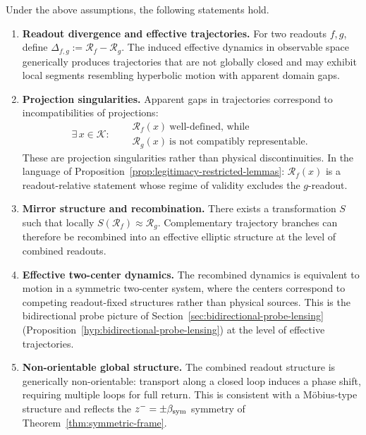 \begin{theorem}
\label{thm:hc-readout-geometry}
Under the above assumptions, the following statements hold.
\begin{enumerate}[label=(\arabic*)]
 \item \textbf{Readout divergence and effective trajectories.}
 For two readouts $f,g$, define
 $\Delta_{f,g} := \mathcal{R}_f - \mathcal{R}_g$.
 The induced effective dynamics in observable space generically
 produces trajectories that are not globally closed and may exhibit
 local segments resembling hyperbolic motion with apparent domain gaps.

 \item \textbf{Projection singularities.}
 Apparent gaps in trajectories correspond to incompatibilities of
 projections:
 \[
 \exists\, x \in \mathcal{K}:\quad
 \begin{aligned}
 &\mathcal{R}_f(x)\ \text{well-defined, while}\\
 &\mathcal{R}_g(x)\ \text{is not compatibly representable.}
 \end{aligned}
 \]
 These are projection singularities rather than physical
 discontinuities. In the language of
 Proposition~\ref{prop:legitimacy-restricted-lemmas}: $\mathcal{R}_f(x)$
 is a readout-relative statement whose regime of validity excludes the
 $g$-readout.

 \item \textbf{Mirror structure and recombination.}
 There exists a transformation $S$ such that locally
 $S(\mathcal{R}_f) \approx \mathcal{R}_g$.
 Complementary trajectory branches can therefore be recombined into
 an effective elliptic structure at the level of combined readouts.

 \item \textbf{Effective two-center dynamics.}
 The recombined dynamics is equivalent to motion in a symmetric
 two-center system, where the centers correspond to competing
 readout-fixed structures rather than physical sources. This is
 the bidirectional probe picture of
 Section~\ref{sec:bidirectional-probe-lensing}
 (Proposition~\ref{hyp:bidirectional-probe-lensing}) at the level of
 effective trajectories.

 \item \textbf{Non-orientable global structure.}
 The combined readout structure is generically non-orientable:
 transport along a closed loop induces a phase shift, requiring
 multiple loops for full return. This is consistent with a
 Möbius-type structure and reflects the $z^- = \pm\beta_{\mathrm{sym}}$
 symmetry of Theorem~\ref{thm:symmetric-frame}.


\end{enumerate}
\end{theorem}
